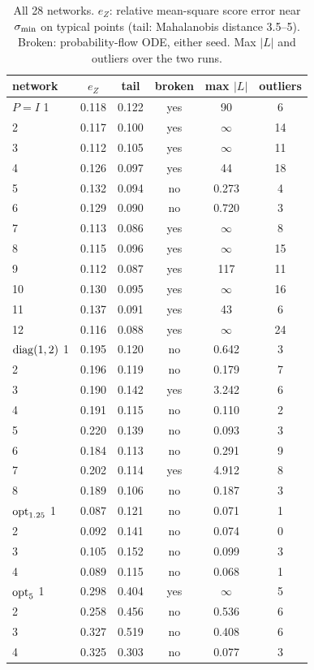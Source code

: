 \begin{table}[h]
\caption{All 28 networks. $e_Z$: relative mean-square score error near $\sigma_{\min}$ on typical points (tail: Mahalanobis distance 3.5--5). Broken: probability-flow ODE, either seed. Max $|L|$ and outliers over the two runs.}
\label{tab:nets}
\footnotesize
\begin{ruledtabular}
\begin{tabular}{lccccc}
network & $e_Z$ & tail & broken & max $|L|$ & outliers \\
\hline
$P=I$ 1 & 0.118 & 0.122 & yes & 90 & 6 \\
2 & 0.117 & 0.100 & yes & $\infty$ & 14 \\
3 & 0.112 & 0.105 & yes & $\infty$ & 11 \\
4 & 0.126 & 0.097 & yes & 44 & 18 \\
5 & 0.132 & 0.094 & no & 0.273 & 4 \\
6 & 0.129 & 0.090 & no & 0.720 & 3 \\
7 & 0.113 & 0.086 & yes & $\infty$ & 8 \\
8 & 0.115 & 0.096 & yes & $\infty$ & 15 \\
9 & 0.112 & 0.087 & yes & 117 & 11 \\
10 & 0.130 & 0.095 & yes & $\infty$ & 16 \\
11 & 0.137 & 0.091 & yes & 43 & 6 \\
12 & 0.116 & 0.088 & yes & $\infty$ & 24 \\
$\mathrm{diag}(1,2)$ 1 & 0.195 & 0.120 & no & 0.642 & 3 \\
2 & 0.196 & 0.119 & no & 0.179 & 7 \\
3 & 0.190 & 0.142 & yes & 3.242 & 6 \\
4 & 0.191 & 0.115 & no & 0.110 & 2 \\
5 & 0.220 & 0.139 & no & 0.093 & 3 \\
6 & 0.184 & 0.113 & no & 0.291 & 9 \\
7 & 0.202 & 0.114 & yes & 4.912 & 8 \\
8 & 0.189 & 0.106 & no & 0.187 & 3 \\
$\mathrm{opt}_{1.25}$ 1 & 0.087 & 0.121 & no & 0.071 & 1 \\
2 & 0.092 & 0.141 & no & 0.074 & 0 \\
3 & 0.105 & 0.152 & no & 0.099 & 3 \\
4 & 0.089 & 0.115 & no & 0.068 & 1 \\
$\mathrm{opt}_{5}$ 1 & 0.298 & 0.404 & yes & $\infty$ & 5 \\
2 & 0.258 & 0.456 & no & 0.536 & 6 \\
3 & 0.327 & 0.519 & no & 0.408 & 6 \\
4 & 0.325 & 0.303 & no & 0.077 & 3 \\
\end{tabular}
\end{ruledtabular}
\end{table}
